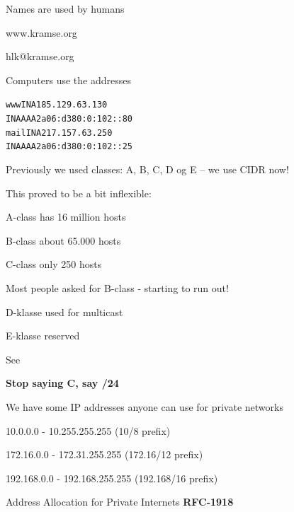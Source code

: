 \documentclass[Screen16to9,17pt]{foils}
\begin{document}

Names are used by humans
\begin{center}\hlkbig
www.kramse.org

hlk@kramse.org
\end{center}

Computers use the addresses

\begin{alltt}
www     IN      A       185.129.63.130
        IN      AAAA    2a06:d380:0:102::80
mail    IN      A       217.157.63.250
        IN      AAAA    2a06:d380:0:102::25
\end{alltt}



\begin{list1}
\item Previously we used classes: A, B, C, D og E -- we use CIDR now!
\item This proved to be a bit inflexible:
\begin{list2}
\item A-class has 16 million hosts
\item B-class about 65.000 hosts
\item C-class only 250 hosts
\end{list2}
\item Most people asked for B-class - starting to run out!
\item D-klasse used for multicast
\item E-klasse reserved
\item See 
\end{list1}

\vskip 5mm
\centerline{\bf Stop saying C, say /24}



\begin{list1}
\item We have some IP addresses anyone can use for private networks
\begin{list2}
\item 10.0.0.0    -  10.255.255.255  (10/8 prefix)
\item 172.16.0.0  -  172.31.255.255  (172.16/12 prefix)
\item 192.168.0.0 -  192.168.255.255 (192.168/16 prefix)
\end{list2}
\item Address Allocation for Private Internets {\bf RFC-1918}
\end{list1}
\end{document}
